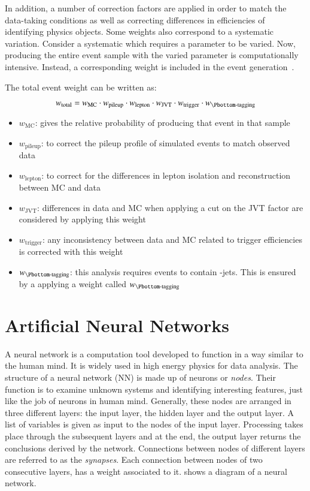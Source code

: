 In addition, a number of correction factors are applied in order to match the data-taking conditions
as well as correcting differences in efficiencies of identifying physics objects. Some weights also correspond to a 
systematic variation. Consider a systematic which 
requires a parameter to be varied. Now, producing the entire event sample with the varied 
parameter is computationally intensive. Instead, a corresponding weight is included in the event 
generation~\cite{10.21468/SciPostPhysCodeb.8}.

The total event weight can be written as:

\begin{equation}
  w_{\text{total}} = w_{\text{MC}} \cdot w_{\text{pileup}} \cdot w_{\text{lepton}} \cdot w_{\text{JVT}} \cdot w_{\text{trigger}} \cdot w_{\text{\Pbottom-tagging}}
\end{equation}


\begin{itemize}
  \item $w_{\text{MC}}$: gives the relative probability of producing that event in that sample
  \item $w_\text{pileup}$: to correct the pileup profile of simulated events to match observed data
  \item $w_{\text{lepton}}$: to correct for the differences in lepton isolation and reconstruction between
  MC and data
  \item $w_{\text{JVT}}$: differences in data and MC when applying a cut on the JVT factor are considered
  by applying this weight
  \item $w_\text{trigger}$: any inconsistency between data and MC related to trigger efficiencies is
  corrected with this weight
  \item $w_\text{\Pbottom-tagging}$: this analysis requires events to contain \Pbottom-jets. This is 
  ensured by a applying a weight called $w_\text{\Pbottom-tagging}$
\end{itemize}


\section{Artificial Neural Networks}
A neural network is a computation tool developed to function in a way similar to the human mind. It is 
widely used in high energy physics for data analysis. The structure of a neural network (NN) is made 
up of neurons or \textit{nodes}. Their function is to examine unknown systems and identifying 
interesting features, just like the job of neurons in human mind. Generally, these nodes are arranged 
in three different layers: the input layer, the hidden layer and the output layer. A list of variables 
is given as input to the nodes of the input layer. Processing takes place through the subsequent 
layers and at the end, the output layer returns the conclusions derived by the network. Connections 
between nodes of different layers are referred to as the \textit{synapses}. Each connection between 
nodes of two consecutive layers, has a weight associated to it.  shows a diagram of a neural network. 

